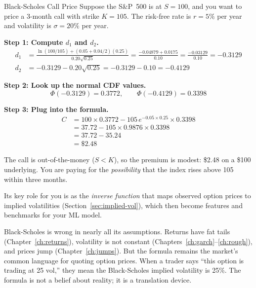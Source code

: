 \begin{workedexample}{Black-Scholes Call Price}
\label{ex:bs-calculation}
Suppose the S\&P~500 is at $S = 100$, and you want to price a 3-month call with strike $K = 105$.
The risk-free rate is $r = 5\%$ per year and volatility is $\sigma = 20\%$ per year.

\textbf{Step 1: Compute $d_1$ and $d_2$.}
\begin{align*}
  d_1 &= \frac{\ln(100/105) + (0.05 + 0.04/2)(0.25)}{0.20\sqrt{0.25}}
       = \frac{-0.04879 + 0.0175}{0.10}
       = \frac{-0.03129}{0.10}
       = -0.3129 \\
  d_2 &= -0.3129 - 0.20\sqrt{0.25}
       = -0.3129 - 0.10
       = -0.4129
\end{align*}

\textbf{Step 2: Look up the normal CDF values.}
\[
  \Phi(-0.3129) = 0.3772, \qquad \Phi(-0.4129) = 0.3398
\]

\textbf{Step 3: Plug into the formula.}
\begin{align*}
  C &= 100 \times 0.3772 - 105\,e^{-0.05 \times 0.25} \times 0.3398 \\
    &= 37.72 - 105 \times 0.9876 \times 0.3398 \\
    &= 37.72 - 35.24 \\
    &= \$2.48
\end{align*}

The call is out-of-the-money ($S < K$), so the premium is modest: \$2.48 on a \$100 underlying.
You are paying for the \emph{possibility} that the index rises above 105 within three months.
\end{workedexample}

\begin{projectconnection}
Its key role for you is as the \emph{inverse function} that maps observed option prices to implied volatilities (Section~\ref{sec:implied-vol}), which then become features and benchmarks for your ML model.
\end{projectconnection}

\begin{warning}
Black-Scholes is wrong in nearly all its assumptions.
Returns have fat tails (Chapter~\ref{ch:returns}), volatility is not constant (Chapters~\ref{ch:garch}--\ref{ch:rough}), and prices jump (Chapter~\ref{ch:jumps}).
But the formula remains the market's common language for quoting option prices.
When a trader says ``this option is trading at 25 vol,'' they mean the Black-Scholes implied volatility is 25\%.
The formula is not a belief about reality; it is a translation device.
\end{warning}

